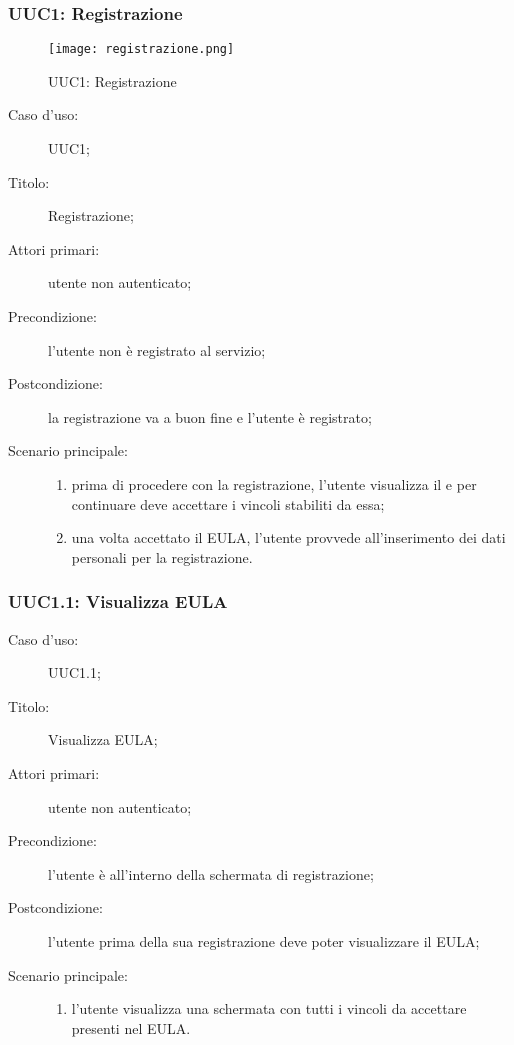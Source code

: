 \documentclass[../../../analisi-dei-requisiti.tex]{subfiles}
\begin{document}
\subsubsection{UUC1: Registrazione}%
\label{subs:UUC1}

\begin{figure}[H]
  \centering
  \texttt{[image: registrazione.png]}
  \caption{UUC1: Registrazione}%
  \label{fig:uuc1}
\end{figure}

\begin{description}
  \item[Caso d'uso:] UUC1;
  \item[Titolo:] Registrazione;
  \item[Attori primari:] utente non autenticato;
  \item[Precondizione:] l'utente non è registrato al servizio;
  \item[Postcondizione:] la registrazione va a buon fine e l'utente è registrato;
  \item[Scenario principale:]
        \begin{enumerate}
          \item prima di procedere con la registrazione, l'utente visualizza il  e per continuare deve accettare i vincoli stabiliti da essa;
          \item una volta accettato il EULA, l'utente provvede all'inserimento dei dati personali per la registrazione.
        \end{enumerate}
\end{description}


\subsubsection{UUC1.1: Visualizza EULA}%
\label{subs:UUC1.1}
\begin{description}
  \item[Caso d'uso:] UUC1.1;
  \item[Titolo:] Visualizza EULA\@;
  \item[Attori primari:] utente non autenticato;
  \item[Precondizione:] l'utente è all'interno della schermata di registrazione;
  \item[Postcondizione:] l'utente prima della sua registrazione deve poter visualizzare il EULA\@;
  \item[Scenario principale:]
        \begin{enumerate}
          \item l'utente visualizza una schermata con tutti i vincoli da accettare presenti nel EULA\@.
        \end{enumerate}
\end{description}
\end{document}
